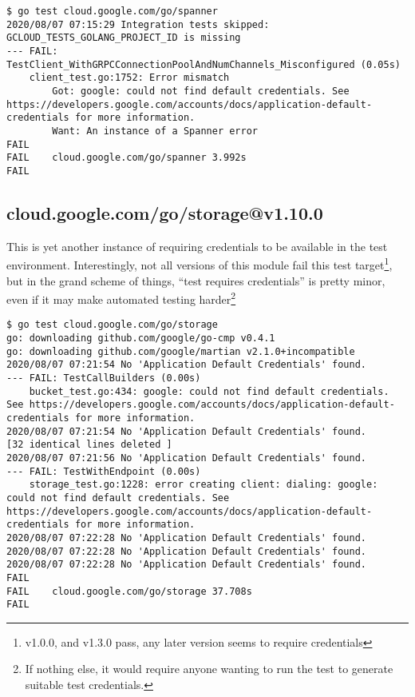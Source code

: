 \documentclass[a4paper]{paper}
\begin{document}
\begin{verbatim}
$ go test cloud.google.com/go/spanner
2020/08/07 07:15:29 Integration tests skipped: GCLOUD_TESTS_GOLANG_PROJECT_ID is missing
--- FAIL: TestClient_WithGRPCConnectionPoolAndNumChannels_Misconfigured (0.05s)
    client_test.go:1752: Error mismatch
        Got: google: could not find default credentials. See https://developers.google.com/accounts/docs/application-default-credentials for more information.
        Want: An instance of a Spanner error
FAIL
FAIL	cloud.google.com/go/spanner	3.992s
FAIL
\end{verbatim}

\subsection{cloud.google.com/go/storage@v1.10.0}

This is yet another instance of requiring credentials to be available in the test environment. Interestingly, not all versions of this module fail this test target\footnote{v1.0.0, and v1.3.0 pass, any later version seems to require credentials}, but in the grand scheme of things, ``test requires credentials'' is pretty minor, even if it may make automated testing harder\footnote{If nothing else, it would require anyone wanting to run the test to generate suitable test credentials.}

\begin{verbatim}
$ go test cloud.google.com/go/storage
go: downloading github.com/google/go-cmp v0.4.1
go: downloading github.com/google/martian v2.1.0+incompatible
2020/08/07 07:21:54 No 'Application Default Credentials' found.
--- FAIL: TestCallBuilders (0.00s)
    bucket_test.go:434: google: could not find default credentials. See https://developers.google.com/accounts/docs/application-default-credentials for more information.
2020/08/07 07:21:54 No 'Application Default Credentials' found.
[32 identical lines deleted ]
2020/08/07 07:21:56 No 'Application Default Credentials' found.
--- FAIL: TestWithEndpoint (0.00s)
    storage_test.go:1228: error creating client: dialing: google: could not find default credentials. See https://developers.google.com/accounts/docs/application-default-credentials for more information.
2020/08/07 07:22:28 No 'Application Default Credentials' found.
2020/08/07 07:22:28 No 'Application Default Credentials' found.
2020/08/07 07:22:28 No 'Application Default Credentials' found.
FAIL
FAIL	cloud.google.com/go/storage	37.708s
FAIL
\end{verbatim}
\end{document}
